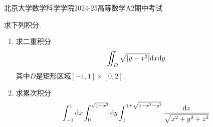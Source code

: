 \documentclass{ctexart}
\begin{document}
\pagestyle{empty}
\begin{center}\Large
    北京大学数学科学学院2024-25高等数学A2期中考试
\end{center}
\begin{problem}[1.(20\songti{分})]
    求下列积分.
    \begin{enumerate}[label=\tbf{(\arabic*)}]
        \item 求二重积分
            \[\iint_D\sqrt{\left|y-x^2\right|}\mathrm{d} x\mathrm{d} y\]
            其中$D$是矩形区域$[-1,1]\times[0,2]$.
        \item 求累次积分
            \[\int_{-1}^1\mathrm{d} x\int_0^{\sqrt{1-x^2}}\mathrm{d} y\int_1^{1+\sqrt{1-x^2-y^2}}\dfrac{\mathrm{d} z}{\sqrt{x^2+y^2+z^2}}\]

    \end{enumerate}
\end{problem}
\end{document}
